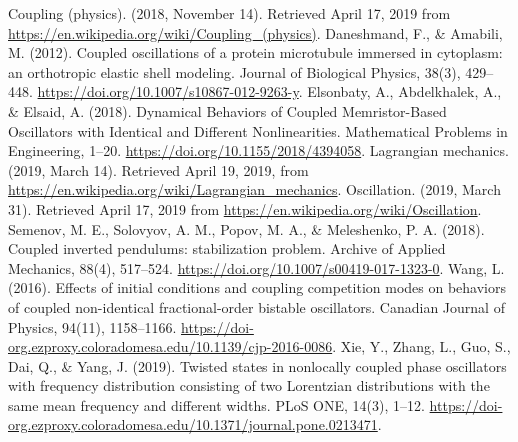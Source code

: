 \documentclass[twocolumn]{article}
\begin{document}
\newpage
\begin{thebibliography}{99}
Coupling (physics). (2018, November 14). Retrieved April 17, 2019 from \url{https://en.wikipedia.org/wiki/Coupling_(physics)}.
Daneshmand, F., \& Amabili, M. (2012). Coupled oscillations of a protein microtubule immersed in cytoplasm: an orthotropic elastic shell modeling. Journal of Biological Physics, 38(3), 429–448. \url{https://doi.org/10.1007/s10867-012-9263-y}.
Elsonbaty, A., Abdelkhalek, A., \& Elsaid, A. (2018). Dynamical Behaviors of Coupled Memristor-Based Oscillators with Identical and Different Nonlinearities. Mathematical Problems in Engineering, 1–20. \url{https://doi.org/10.1155/2018/4394058}.
Lagrangian mechanics. (2019, March 14). Retrieved April 19, 2019, from \url{https://en.wikipedia.org/wiki/Lagrangian_mechanics}.
Oscillation. (2019, March 31). Retrieved April 17, 2019 from \url{https://en.wikipedia.org/wiki/Oscillation}.
Semenov, M. E., Solovyov, A. M., Popov, M. A., \& Meleshenko, P. A. (2018). Coupled inverted pendulums: stabilization problem. Archive of Applied Mechanics, 88(4), 517–524. \url{https://doi.org/10.1007/s00419-017-1323-0}.
Wang, L. (2016). Effects of initial conditions and coupling competition modes on behaviors of coupled non-identical fractional-order bistable oscillators. Canadian Journal of Physics, 94(11), 1158–1166. \url{https://doi-org.ezproxy.coloradomesa.edu/10.1139/cjp-2016-0086}.
Xie, Y., Zhang, L., Guo, S., Dai, Q., \& Yang, J. (2019). Twisted states in nonlocally coupled phase oscillators with frequency distribution consisting of two Lorentzian distributions with the same mean frequency and different widths. PLoS ONE, 14(3), 1–12. \url{https://doi-org.ezproxy.coloradomesa.edu/10.1371/journal.pone.0213471}.
\end{thebibliography}
\end{document}
